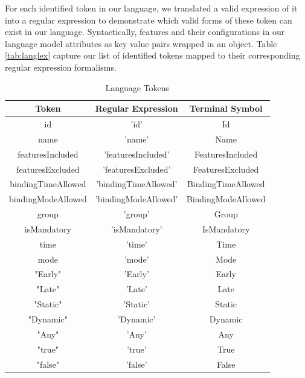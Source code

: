 \documentclass[conference]{IEEEtran}
\begin{document}
For each identified token in our language, we translated a valid expression of it into a regular expression to demonstrate which valid forms of these token can exist in our language. Syntactically, features and their configurations in our language model attributes as key value pairs wrapped in an object. Table \ref{tab:langlex} capture our list of identified tokens mapped to their corresponding regular expression formalisms.

\begin{table}[htbp]
\caption{Language Tokens}
\begin{center}
\begin{tabular}{|c|c|c|}
\hline
    Token & Regular Expression & Terminal Symbol \\\hline
                             id & 'id' & Id  \\\hline
                             name & 'name' & Name \\ \hline
                             featuresIncluded & 'featuresIncluded' & FeaturesIncluded\\ \hline
                             featuresExcluded & 'featuresExcluded' & FeaturesExcluded\\ \hline
                             bindingTimeAllowed & 'bindingTimeAllowed' & BindingTimeAllowed\\ \hline
                             bindingModeAllowed & 'bindingModeAllowed' & BindingModeAllowed\\\hline
                             group & 'group' & Group\\ \hline
                             isMandatory & 'isMandatory' & IsMandatory\\ \hline
                             time & 'time' & Time\\ \hline
                             mode & 'mode' & Mode\\ \hline
                              "Early" & 'Early' & Early\\ \hline
                              "Late" & 'Late' & Late\\ \hline
                              "Static" & 'Static' & Static\\ \hline
                              "Dynamic" & 'Dynamic' & Dynamic\\ \hline
                              "Any" & 'Any' & Any\\ \hline
                              "true" & 'true' & True\\ \hline
                              "false" & 'false' & False\\ \hline

\end{tabular}
\end{center}
\end{table}
\end{document}
